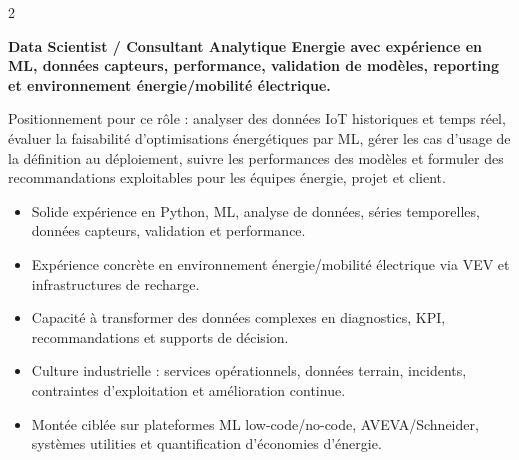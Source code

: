 \documentclass[8pt,a4paper,ragged2e,withhyper]{altacv}
\begin{document}
\begin{paracol}{2}
\switchcolumn


\textbf{Data Scientist / Consultant Analytique Energie avec expérience en ML, données capteurs, performance, validation de modèles, reporting et environnement énergie/mobilité électrique.}

Positionnement pour ce rôle : analyser des données IoT historiques et temps réel, évaluer la faisabilité d'optimisations énergétiques par ML, gérer les cas d'usage de la définition au déploiement, suivre les performances des modèles et formuler des recommandations exploitables pour les équipes énergie, projet et client.

\begin{itemize}
  \item Solide expérience en Python, ML, analyse de données, séries temporelles, données capteurs, validation et performance.
  \item Expérience concrète en environnement énergie/mobilité électrique via VEV et infrastructures de recharge.
  \item Capacité à transformer des données complexes en diagnostics, KPI, recommandations et supports de décision.
  \item Culture industrielle : services opérationnels, données terrain, incidents, contraintes d'exploitation et amélioration continue.
  \item Montée ciblée sur plateformes ML low-code/no-code, AVEVA/Schneider, systèmes utilities et quantification d'économies d'énergie.
\end{itemize}


\divider
{}
\divider

\medskip



\divider


\divider


\divider



\end{paracol}
\end{document}
